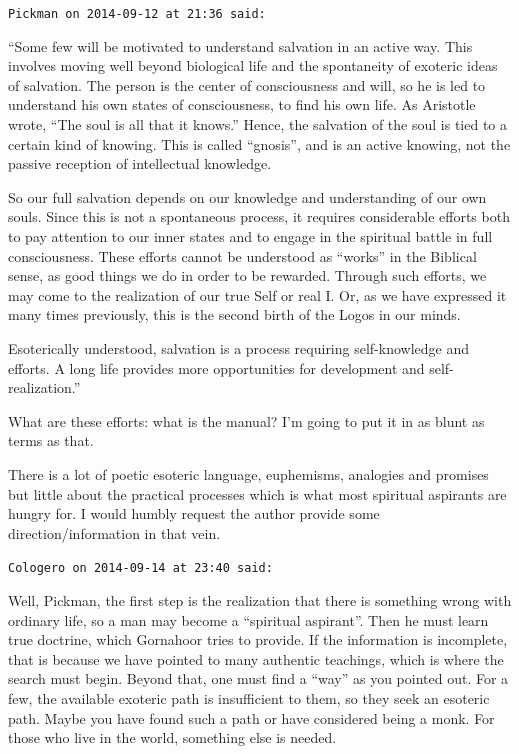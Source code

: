 \begin{footnotesize}
\begin{sffamily}
\texttt{Pickman on 2014-09-12 at 21:36 said:}

``Some few will be motivated to understand salvation in an active way. This involves moving well beyond biological life and the spontaneity of exoteric ideas of salvation. The person is the center of consciousness and will, so he is led to understand his own states of consciousness, to find his own life. As Aristotle wrote, ``The soul is all that it knows.'' Hence, the salvation of the soul is tied to a certain kind of knowing. This is called ``gnosis'', and is an active knowing, not the passive reception of intellectual knowledge.

So our full salvation depends on our knowledge and understanding of our own souls. Since this is not a spontaneous process, it requires considerable efforts both to pay attention to our inner states and to engage in the spiritual battle in full consciousness. These efforts cannot be understood as ``works'' in the Biblical sense, as good things we do in order to be rewarded. Through such efforts, we may come to the realization of our true Self or real I. Or, as we have expressed it many times previously, this is the second birth of the Logos in our minds.

Esoterically understood, salvation is a process requiring self-knowledge and efforts. A long life provides more opportunities for development and self-realization.''

What are these efforts: what is the manual? I'm going to put it in as blunt as terms as that.

There is a lot of poetic esoteric language, euphemisms, analogies and promises but little about the practical processes which is what most spiritual aspirants are hungry for. I would humbly request the author provide some direction/information in that vein.

\hfill

\texttt{Cologero on 2014-09-14 at 23:40 said:}

Well, Pickman, the first step is the realization that there is something wrong with ordinary life, so a man may become a ``spiritual aspirant''. Then he must learn true doctrine, which Gornahoor tries to provide. If the information is incomplete, that is because we have pointed to many authentic teachings, which is where the search must begin. Beyond that, one must find a ``way'' as you pointed out. For a few, the available exoteric path is insufficient to them, so they seek an esoteric path. Maybe you have found such a path or have considered being a monk. For those who live in the world, something else is needed.


\end{sffamily}
\end{footnotesize}
